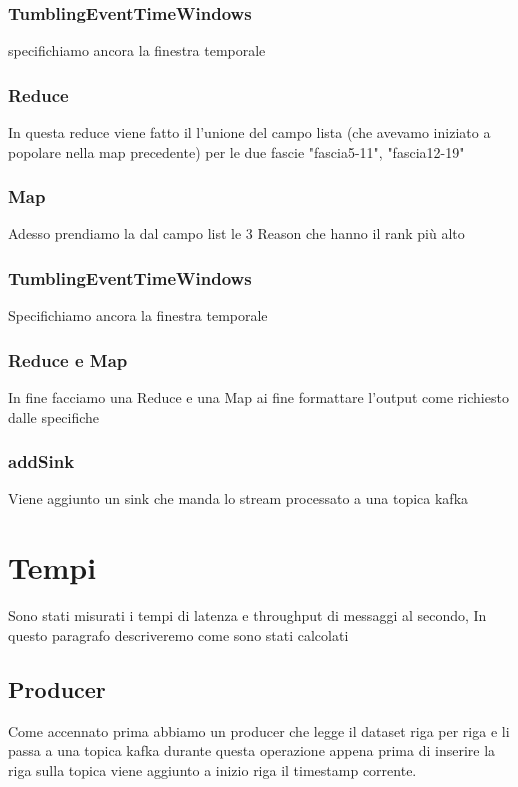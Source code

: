 \documentclass[acmsmall]{acmart}
\begin{document}
\subsubsection{TumblingEventTimeWindows}
specifichiamo ancora la finestra temporale

\subsubsection{Reduce}
In questa reduce viene fatto il l'unione del campo lista (che avevamo iniziato a popolare nella map precedente) per le due fascie "fascia5-11", "fascia12-19"

\subsubsection{Map}
Adesso prendiamo la dal campo list le 3 Reason che hanno il rank più alto

\subsubsection{TumblingEventTimeWindows}
Specifichiamo ancora la finestra temporale

\subsubsection{Reduce e Map}
In fine facciamo una Reduce e una Map ai fine formattare l'output come richiesto dalle specifiche
\subsubsection{addSink}
Viene aggiunto un sink che manda lo stream processato a una topica kafka


\section{Tempi}

Sono stati misurati i tempi di latenza e throughput di messaggi al secondo,
In questo paragrafo descriveremo come sono stati calcolati 


\subsection{Producer}
Come accennato prima abbiamo un producer che legge il dataset riga per riga  e li passa a una topica kafka durante questa operazione appena prima di inserire la riga sulla topica viene aggiunto a inizio riga il timestamp corrente.
\end{document}
